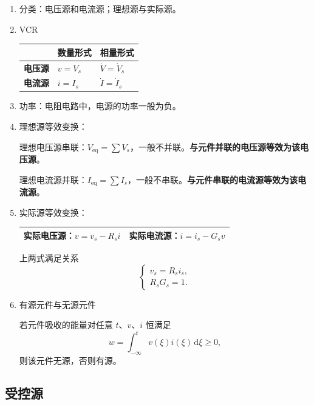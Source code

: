\documentclass[UTF8,fontset=fandol,zihao=5]{ctexart}
\begin{document}
\begin{enumerate}
  \item 分类：电压源和电流源；理想源与实际源。

  \item VCR

  \begin{center}
    \begin{tabularx}{0.92\textwidth}{>{\bfseries}p{2.5cm}XX}
      \toprule
      & 数量形式 & 相量形式 \\
      \midrule
      电压源 & \(v=V_s\) & \(\dot V=\dot V_s\) \\
      电流源 & \(i=I_s\) & \(\dot I=\dot I_s\) \\
      \bottomrule
    \end{tabularx}
  \end{center}

  \item 功率：电阻电路中，电源的功率一般为负。

  \item 理想源等效变换：

  理想电压源串联：\(V_{\mathrm{eq}}=\displaystyle\sum V_s\)，一般不并联。\textbf{与元件并联的电压源等效为该电压源}。

  理想电流源并联：\(I_{\mathrm{eq}}=\displaystyle\sum I_s\)，一般不串联。\textbf{与元件串联的电流源等效为该电流源}。

  \item 实际源等效变换：

  \begin{center}
    \begin{tabularx}{0.92\textwidth}{XX}
      \toprule
      实际电压源：\(v=v_s-R_si\) & 实际电流源：\(i=i_s-G_sv\) \\
      \bottomrule
    \end{tabularx}
  \end{center}

  上两式满足关系
  \[
    \begin{cases}
      v_s=R_si_s,\\
      R_sG_s=1.
    \end{cases}
  \]

  \item 有源元件与无源元件

  若元件吸收的能量对任意 \(t\)、\(v\)、\(i\) 恒满足
  \[
    w=\int_{-\infty}^{t}v(\xi)i(\xi)\,\mathrm{d}\xi\geq 0,
  \]
  则该元件无源，否则有源。
\end{enumerate}

\subsection{受控源}
\end{document}
